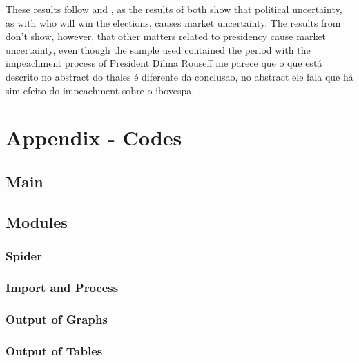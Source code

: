 \documentclass[cic,tc, english]{iiufrgs}
\begin{document}
    These results follow \cite{smales2015} and \cite{marquessantos2016}, as the results of both show that political uncertainty, as with who will win the elections, causes market uncertainty. The results from \cite{marquessantos2016} don't show, however, that other matters related to presidency cause market uncertainty, even though the sample used contained the period with the impeachment process of President Dilma Rouseff {me parece que o que está descrito no abstract do thales é diferente da conclusao, no abstract ele fala que há sim efeito do impeachment sobre o ibovespa}.



















    
\chapter{Appendix - Codes} \label{chapter_appendix}

\section{Main}

    

\section{Modules}

\subsection{Spider}

    

\subsection{Import and Process}

    

\subsection{Output of Graphs}

    

\subsection{Output of Tables}

    


 \label{chapter_bibliography}
\end{document}
